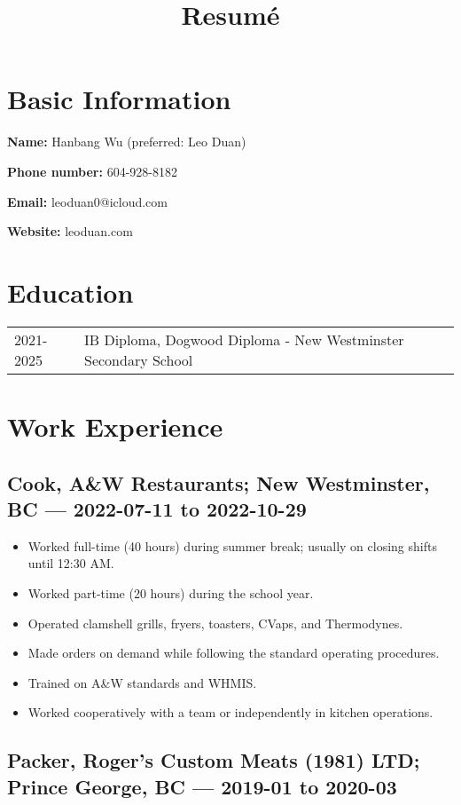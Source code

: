 \documentclass{article}
\title{\textbf{Resumé}}
\author{}
\date{}
\begin{document}
\maketitle

\section*{Basic Information}

\textbf{Name:} Hanbang Wu (preferred: Leo Duan)

\textbf{Phone number:} 604-928-8182

\textbf{Email:} leoduan0@icloud.com

\textbf{Website:} leoduan.com

\section*{Education}

\begin{tabular}{@{}ll}
	2021-2025 & IB Diploma, Dogwood Diploma - New Westminster Secondary School \\
\end{tabular}

\section*{Work Experience}

\subsection*{Cook, A\&W Restaurants; New Westminster, BC — 2022-07-11 to 2022-10-29}

\begin{itemize}
	\item Worked full-time (40 hours) during summer break; usually on closing shifts until 12:30 AM.
	\item Worked part-time (20 hours) during the school year.
	\item Operated clamshell grills, fryers, toasters, CVaps, and Thermodynes.
	\item Made orders on demand while following the standard operating procedures.
	\item Trained on A\&W standards and WHMIS.
	\item Worked cooperatively with a team or independently in kitchen operations.
\end{itemize}

\subsection*{Packer, Roger's Custom Meats (1981) LTD; Prince George, BC — 2019-01 to 2020-03}
\end{document}
